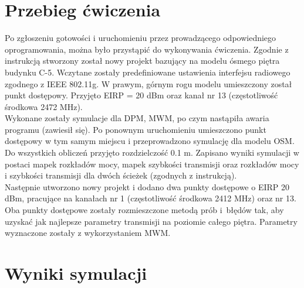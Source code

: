 \documentclass[12pt, a4paper, oneside]{article}
\begin{document}
\section{Przebieg ćwiczenia}
\indent\indent Po zgłoszeniu gotowości i uruchomieniu przez prowadzącego odpowiedniego oprogramowania, można było przystąpić do wykonywania ćwiczenia. Zgodnie z instrukcją stworzony został nowy projekt bazujący na modelu ósmego piętra budynku C-5. Wczytane zostały predefiniowane ustawienia interfejsu radiowego zgodnego z IEEE 802.11g. W prawym, górnym rogu modelu umieszczony został punkt dostępowy. Przyjęto EIRP = 20 dBm oraz kanał nr 13 (częstotliwość środkowa 2472 MHz).\\
\indent Wykonane zostały symulacje dla DPM, MWM, po czym nastąpiła awaria programu (zawiesił się). Po ponownym uruchomieniu umieszczono punkt dostępowy w tym samym miejscu i przeprowadzono symulację dla modelu OSM.\\
\indent Do wszystkich obliczeń przyjęto rozdzielczość 0.1 m. Zapisano wyniki symulacji w postaci mapek rozkładów mocy, mapek szybkości transmisji oraz rozkładów mocy i szybkości transmisji dla dwóch ścieżek (zgodnych z instrukcją).\\
\indent Następnie utworzono nowy projekt i dodano dwa punkty dostępowe o EIRP 20 dBm, pracujące na kanałach nr 1 (częstotliwość środkowa 2412 MHz) oraz nr 13. Oba punkty dostępowe zostały rozmieszczone metodą prób i~błędów tak, aby uzyskać jak najlepsze parametry transmisji na poziomie całego piętra. Parametry wyznaczone zostały z wykorzystaniem MWM.
\clearpage
\section{Wyniki symulacji}
\end{document}

